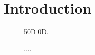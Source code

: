 \section{Introduction}
\lipsum[5]




\begin{figure}[h]
	\centering
    
	\caption{50D 0D.}
	\label{fig:controllerboardv2_}
\end{figure}

\begin{figure}[h]
	\centering
    
	\caption{....}
	\label{fig:controllerboardv2_}
\end{figure}

